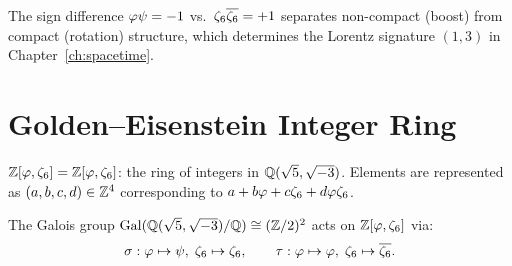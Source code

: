 \begin{remark}
The sign difference $\varphi\psi = -1$ vs.\ $\zeta_6\overline{\zeta_6} = +1$
separates non-compact (boost) from compact (rotation) structure,
which determines the Lorentz signature $(1,3)$ in Chapter~\ref{ch:spacetime}.
\end{remark}

\section{Golden--Eisenstein Integer Ring}

\begin{definition}[$\GEI$]
\label{def:gei}
$\mathbb{Z}[\varphi,\zeta_6] = \mathbb{Z}[\varphi,\zeta_6]$: the ring of integers in $\mathbb{Q}(\sqrt5, \sqrt{-3})$.
Elements are represented as $(a, b, c, d) \in \mathbb{Z}^4$
corresponding to $a + b\varphi + c\zeta_6 + d\varphi\zeta_6$.
\end{definition}

\begin{definition}
\label{def:galois}
The Galois group $\mathrm{Gal}(\mathbb{Q}(\sqrt5,\sqrt{-3})/\mathbb{Q}) \cong (\mathbb{Z}/2)^2$
acts on $\GEI$ via:
\[
  \sigma: \varphi \mapsto \psi,\; \zeta_6 \mapsto \zeta_6,
  \qquad
  \tau: \varphi \mapsto \varphi,\; \zeta_6 \mapsto \overline{\zeta_6}.
\]
\end{definition}
